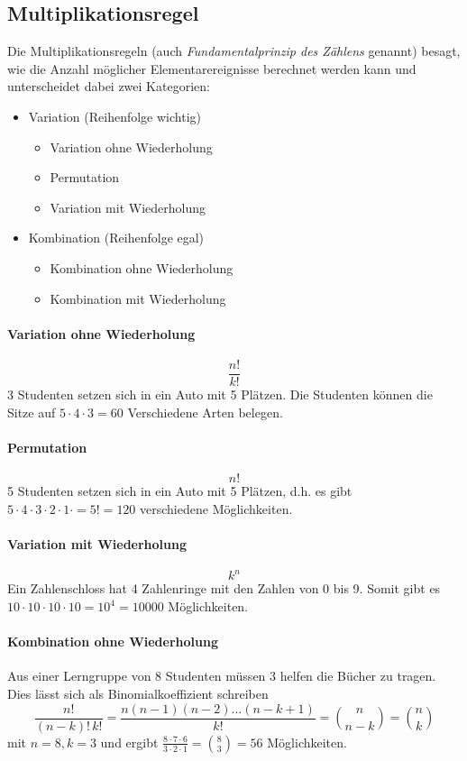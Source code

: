 \subsection{Multiplikationsregel}\label{sec:multiplikationsregel}
Die Multiplikationsregeln (auch \emph{Fundamentalprinzip des 
Zählens} genannt) besagt, wie die Anzahl möglicher Elementarereignisse
berechnet werden kann und unterscheidet dabei zwei Kategorien:
\begin{itemize}
	\item Variation \hfill{} (Reihenfolge wichtig)
	\begin{itemize}
		\item Variation ohne Wiederholung
		\item Permutation
		\item Variation mit Wiederholung
	\end{itemize}
	\item Kombination \hfill{} (Reihenfolge egal)
	\begin{itemize}
		\item Kombination ohne Wiederholung
		\item Kombination mit Wiederholung
	\end{itemize}
\end{itemize}

\paragraph{Variation ohne Wiederholung}
\[ 
	\frac{n!}{k!} 
\]
3 Studenten setzen sich in ein Auto mit 5 Plätzen.
Die Studenten können die Sitze auf $5 \cdot 4 \cdot 3 = 60$
Verschiedene Arten belegen.
\paragraph{Permutation}
\[ 
	n! 
\]
5 Studenten setzen sich in ein Auto mit 5 Plätzen, 
d.h. es gibt 
$5 \cdot 4 \cdot 3 \cdot 2 \cdot 1 \cdot = 5! = 120$
verschiedene Möglichkeiten.
\paragraph{Variation mit Wiederholung}
\[ k^n \]
Ein Zahlenschloss hat 4 Zahlenringe mit den Zahlen von 0 bis 9.
Somit gibt es $10 \cdot 10 \cdot 10 \cdot 10 = 10^4 = 10000$ 
Möglichkeiten.

\paragraph{Kombination ohne Wiederholung}
Aus einer Lerngruppe von 8 Studenten müssen 3 helfen die
Bücher zu tragen. Dies lässt sich als Binomialkoeffizient
schreiben 
\[ 
	\frac{n!}{(n-k)!\, k!} 
		= \frac{n(n-1)(n-2)\dots(n-k+1)}{k!} 
		= \binom{n}{n-k} 
		= \binom{n}{k} 
\]
mit $n=8, k=3$ und ergibt
$\frac{8 \cdot 7 \cdot 6}{3 \cdot 2 \cdot 1} = \binom{8}{3} = 56$
Möglichkeiten.
